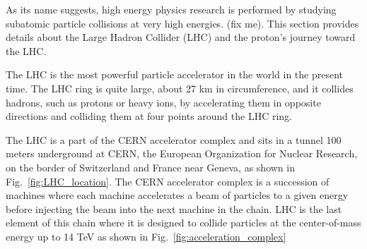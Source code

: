 
As its name suggests, high energy physics research is performed by studying subatomic particle collisions at very high energies. (fix me).
This section provides details about the Large Hadron Collider (LHC) and the proton's journey toward the LHC. %

The LHC is the most powerful particle accelerator in the world in the present time.
The LHC ring is quite large, about 27 km in circumference, and it collides hadrons, such as protons or heavy ions,
by accelerating them in opposite directions and colliding them at four points around the LHC ring.

The LHC is a part of the CERN accelerator complex and sits in a tunnel 100 meters underground at CERN, the European Organization for Nuclear Research, on the border of Switzerland and France near Geneva, as shown in Fig.~\ref{fig:LHC_location}. The CERN accelerator complex is a succession of machines where each machine accelerates a beam of particles to a given energy before injecting the beam into the next machine in the chain. LHC is the last element of this chain where it is designed to collide particles at the center-of-mass energy up to 14 TeV as shown
in Fig.~\ref{fig:acceleration_complex}

